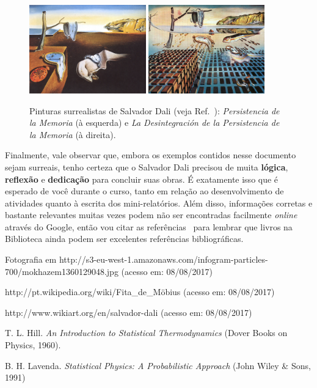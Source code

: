 \documentclass[a4wide]{report}
\begin{document}
\begin{figure}[h]
\centering
\includegraphics[width=0.45\textwidth]{fig2a_the-persistence-of-memory}%
\includegraphics[width=0.447\textwidth]{fig2b_the-disintegration-of-the-persistence-of-memory}
\caption{Pinturas surrealistas de Salvador Dali (veja Ref.~\cite{dali_paintings}): {\it Persistencia de 
la Memoria} (à esquerda) e  {\it La Desintegración de la Persistencia de la Memoria}
(à direita).}
\label{pinturas_de_Dali}
\end{figure}

Finalmente, vale observar que, embora os exemplos contidos nesse documento sejam surreais, 
tenho certeza que o Salvador Dali precisou de muita {\bf lógica}, {\bf reflexão} e 
{\bf dedicação} para concluir suas obras. 
	É exatamente isso que é esperado de você durante o curso, tanto em relação ao 
desenvolvimento de atividades quanto à escrita dos mini-relatórios.
	Além disso, informações corretas e bastante relevantes muitas vezes podem não ser 
encontradas facilmente {\it online} através do Google, então vou citar as 
referências~\cite{hill,lavenda} para lembrar que livros na Biblioteca ainda podem ser 
excelentes referências bibliográficas.





\begin{thebibliography}{99}

 Fotografia em http://s3-eu-west-1.amazonaws.com/infogram-particles-700/mokhazem1360129048.jpg (acesso em: 08/08/2017)

 http://pt.wikipedia.org/wiki/Fita\_de\_M\"obius (acesso em: 08/08/2017)

 http://www.wikiart.org/en/salvador-dali (acesso em: 08/08/2017)

 T. L. Hill. {\it An Introduction to Statistical Thermodynamics} (Dover Books on Physics, 1960).

 B. H. Lavenda. {\it Statistical Physics: A Probabilistic Approach} (John Wiley \& Sons, 1991)


\end{thebibliography}
\end{document}
